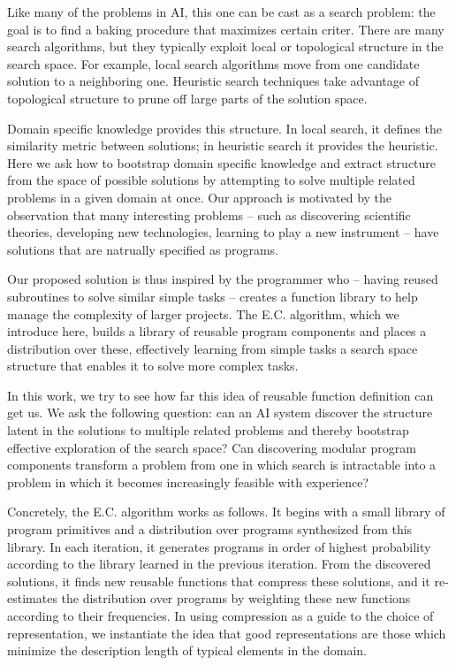 \documentclass{article}
\begin{document}
Like many of the problems in AI, this one can be cast as a search
problem: the goal is to find a baking procedure that maximizes certain
criter.  There are many search algorithms, but they typically exploit
local or topological structure in the search space. For example, local
search algorithms move from one candidate solution to a neighboring
one. Heuristic search techniques take advantage of topological
structure to prune off large parts of the solution space.

Domain specific knowledge provides this structure. In local search, it
defines the similarity metric between solutions; in heuristic search
it provides the heuristic. Here we ask how to bootstrap domain
specific knowledge and extract structure from the space of possible
solutions by attempting to solve multiple related problems in a given
domain at once. Our approach is motivated by the observation that many
interesting problems -- such as discovering scientific theories,
developing new technologies, learning to play a new instrument -- have
solutions that are natrually specified as programs.

Our proposed solution is thus inspired by the programmer who -- having
reused subroutines to solve similar simple tasks -- creates a function
library to help manage the complexity of larger projects. The
E.C. algorithm, which we introduce here, builds a library of reusable
program components and places a distribution over these, effectively
learning from simple tasks a search space structure that enables it to
solve more complex tasks.

In this work, we try to see how far this idea of reusable function
definition can get us. We ask the following question: can an AI system
discover the structure latent in the solutions to multiple related
problems and thereby bootstrap effective exploration of the search
space? Can discovering modular program components transform a problem
from one in which search is intractable into a problem in which it
becomes increasingly feasible with experience?

Concretely, the E.C. algorithm works as follows. It begins with a small
library of program primitives and a distribution over programs
synthesized from this library. In each iteration, it generates
programs in order of highest probability according to the library
learned in the previous iteration. From the discovered solutions, it
finds new reusable functions that compress these solutions, and it
re-estimates the distribution over programs by weighting these new
functions according to their frequencies. In using compression as a
guide to the choice of representation, we instantiate the idea that
good representations are those which minimize the description length
of typical elements in the domain.
\end{document}
